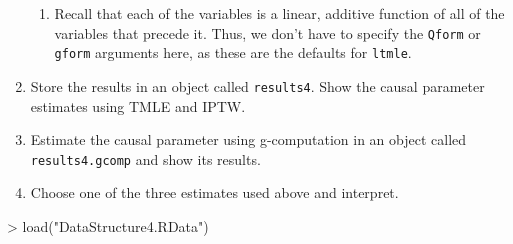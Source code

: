 \documentclass[answers]{exam}
\begin{document}
\begin{enumerate}
\begin{enumerate}
\item Recall that each of the variables is a linear, additive function of all of the variables that precede it. Thus, we don't have to specify the \texttt{Qform} or \texttt{gform} arguments here, as these are the defaults for \texttt{ltmle}.
\end{enumerate}
\item Store the results in an object called \texttt{results4}. Show the causal parameter estimates using TMLE and IPTW.
\item Estimate the causal parameter using g-computation in an object called \texttt{results4.gcomp} and show its results.
\item Choose one of the three estimates used above and interpret.
\end{enumerate}

\begin{solution}
\begin{Schunk}
\begin{Sinput}
> load("DataStructure4.RData")
\end{Sinput}
\end{Schunk}


\end{solution}
\end{document}
